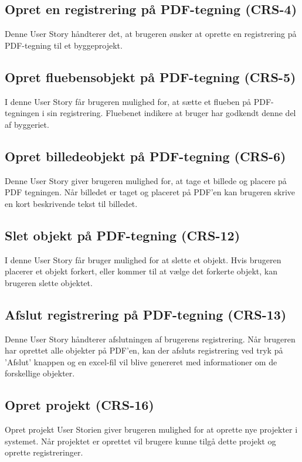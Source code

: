 	\subsection*{Opret en registrering på PDF-tegning (CRS-4)}
	Denne User Story håndterer det, at brugeren ønsker at oprette en registrering på PDF-tegning til et byggeprojekt.
	
	\subsection*{Opret fluebensobjekt på PDF-tegning (CRS-5)}
	I denne User Story får brugeren mulighed for, at sætte et flueben på PDF-tegningen i sin registrering. Fluebenet indikere at bruger har godkendt denne del af byggeriet.

	\subsection*{Opret billedeobjekt på PDF-tegning (CRS-6)}
	Denne User Story giver brugeren mulighed for, at tage et billede og placere på PDF tegningen. Når billedet er taget og placeret på PDF'en kan brugeren skrive en kort beskrivende tekst til billedet.
		
	\subsection*{Slet objekt på PDF-tegning (CRS-12)}
	I denne User Story får bruger mulighed for at slette et objekt. Hvis brugeren placerer et objekt forkert, eller kommer til at vælge det forkerte objekt, kan brugeren slette objektet. 

	\subsection*{Afslut registrering på PDF-tegning (CRS-13)}
	Denne User Story håndterer afslutningen af brugerens registrering. Når brugeren har oprettet alle objekter på PDF'en, kan der afsluts registrering ved tryk på 'Afslut' knappen og en excel-fil vil blive genereret med informationer om de forskellige objekter.
	
	\subsection*{Opret projekt (CRS-16)}
	Opret projekt User Storien giver brugeren mulighed for at oprette nye projekter i systemet. Når projektet er oprettet vil brugere kunne tilgå dette projekt og oprette registreringer. \\
	


